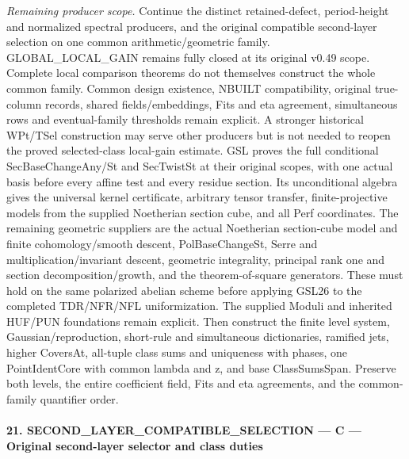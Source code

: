 \documentclass[11pt,a4paper]{article}
\numberwithin{equation}{section}
\theoremstyle{remark}\newtheorem{remark}[theorem]{Remark}
\begin{document}
\emph{Remaining producer scope.} Continue the distinct retained-defect, period-height and normalized spectral producers, and the original compatible second-layer selection on one common arithmetic/geometric family. GLOBAL\_\allowbreak LOCAL\_\allowbreak GAIN remains fully closed at its original v0.49 scope. Complete local comparison theorems do not themselves construct the whole common family. Common design existence, NBUILT compatibility, original true-column records, shared fields/embeddings, Fits and eta agreement, simultaneous rows and eventual-family thresholds remain explicit. A stronger historical WPt/TSel construction may serve other producers but is not needed to reopen the proved selected-class local-gain estimate. GSL proves the full conditional SecBaseChangeAny/St and SecTwistSt at their original scopes, with one actual basis before every affine test and every residue section. Its unconditional algebra gives the universal kernel certificate, arbitrary tensor transfer, finite-projective models from the supplied Noetherian section cube, and all Perf coordinates. The remaining geometric suppliers are the actual Noetherian section-cube model and finite cohomology/smooth descent, PolBaseChangeSt, Serre and multiplication/invariant descent, geometric integrality, principal rank one and section decomposition/growth, and the theorem-of-square generators. These must hold on the same polarized abelian scheme before applying GSL26 to the completed TDR/NFR/NFL uniformization. The supplied Moduli and inherited HUF/PUN foundations remain explicit. Then construct the finite level system, Gaussian/reproduction, short-rule and simultaneous dictionaries, ramified jets, higher CoversAt, all-tuple class sums and uniqueness with phases, one PointIdentCore with common lambda and z, and base ClassSumsSpan. Preserve both levels, the entire coefficient field, Fits and eta agreements, and the common-family quantifier order.



\paragraph{21. SECOND\_\allowbreak LAYER\_\allowbreak COMPATIBLE\_\allowbreak SELECTION — C — Original second-layer selector and class duties}
\end{document}

